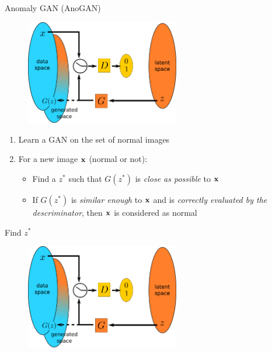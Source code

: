 \documentclass[xcolor=pdftex,dvipsnames,table,mathserif]{beamer}
\begin{document}
\begin{frame}{Anomaly GAN (AnoGAN) \cite{schlegl_unsupervised_2017}}

\begin{figure}[ht]
  \centering
  \includegraphics[width=0.6\textwidth]{gan2}
\end{figure}

\begin{enumerate}
\item Learn a GAN on the set of normal images
\item For a new image $\mathbf{x}$ (normal or not):
  \begin{itemize}
  \item Find a $z^*$ such that $G(z^*)$ is \emph{close as possible} to $\mathbf{x}$
  \item If $G(z^*)$ is \emph{similar enough} to $\mathbf{x}$ and is \emph{correctly evaluated by the descriminator}, then $\mathbf{x}$ is considered as normal
  \end{itemize}
\end{enumerate}

\end{frame}

\begin{frame}{Find $z^*$}

  \begin{figure}[ht]
  \centering
  \includegraphics[width=0.6\textwidth]{gan2}
\end{figure}



\end{frame}
\end{document}
